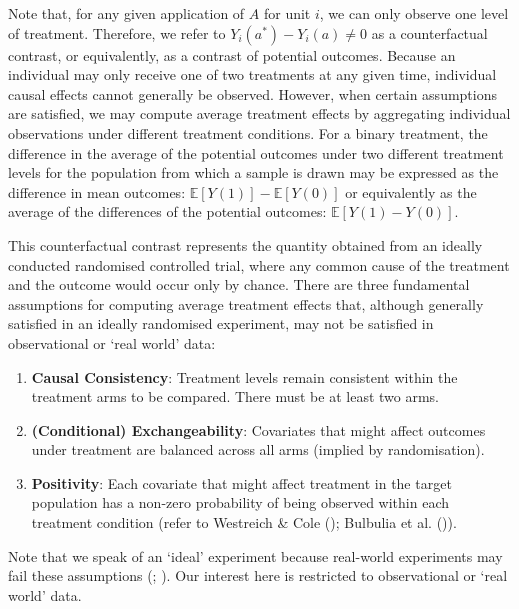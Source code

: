 \documentclass[
  single column]{article}
\providecommand{\tightlist}{%
  \setlength{\itemsep}{0pt}\setlength{\parskip}{0pt}}\usepackage{longtable,booktabs,array}
\begin{document}
Note that, for any given application of \(A\) for unit \(i\), we can
only observe one level of treatment. Therefore, we refer to
\(Y_i(a^*) - Y_i(a) \neq 0\) as a counterfactual contrast, or
equivalently, as a contrast of potential outcomes. Because an individual
may only receive one of two treatments at any given time, individual
causal effects cannot generally be observed. However, when certain
assumptions are satisfied, we may compute average treatment effects by
aggregating individual observations under different treatment
conditions. For a binary treatment, the difference in the average of the
potential outcomes under two different treatment levels for the
population from which a sample is drawn may be expressed as the
difference in mean outcomes: \(\mathbb{E}[Y(1)] - \mathbb{E}[Y(0)]\) or
equivalently as the average of the differences of the potential
outcomes: \(\mathbb{E}[Y(1) - Y(0)]\).

This counterfactual contrast represents the quantity obtained from an
ideally conducted randomised controlled trial, where any common cause of
the treatment and the outcome would occur only by chance. There are
three fundamental assumptions for computing average treatment effects
that, although generally satisfied in an ideally randomised experiment,
may not be satisfied in observational or `real world' data:

\begin{enumerate}
\def\labelenumi{\arabic{enumi}.}
\tightlist
\item
  \textbf{Causal Consistency}: Treatment levels remain consistent within
  the treatment arms to be compared. There must be at least two arms.
\item
  \textbf{(Conditional) Exchangeability}: Covariates that might affect
  outcomes under treatment are balanced across all arms (implied by
  randomisation).
\item
  \textbf{Positivity}: Each covariate that might affect treatment in the
  target population has a non-zero probability of being observed within
  each treatment condition (refer to Westreich \& Cole
  (); Bulbulia et al.
  ()).
\end{enumerate}

Note that we speak of an `ideal' experiment because real-world
experiments may fail these assumptions
(;
). Our interest here
is restricted to observational or `real world' data.
\end{document}
